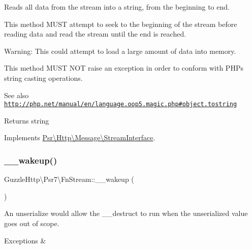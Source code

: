 Reads all data from the stream into a string, from the beginning to end.

This method M\+U\+ST attempt to seek to the beginning of the stream before reading data and read the stream until the end is reached.

Warning\+: This could attempt to load a large amount of data into memory.

This method M\+U\+ST N\+OT raise an exception in order to conform with P\+HP\textquotesingle{}s string casting operations.

\begin{DoxySeeAlso}{See also}
\href{http://php.net/manual/en/language.oop5.magic.php#object.tostring}{\tt http\+://php.\+net/manual/en/language.\+oop5.\+magic.\+php\#object.\+tostring} 
\end{DoxySeeAlso}
\begin{DoxyReturn}{Returns}
string 
\end{DoxyReturn}


Implements \hyperlink{interfacePsr_1_1Http_1_1Message_1_1StreamInterface_a72df4e8851ae1a81087f3415fd6d73cd}{Psr\textbackslash{}\+Http\textbackslash{}\+Message\textbackslash{}\+Stream\+Interface}.

\mbox{\label{classGuzzleHttp_1_1Psr7_1_1FnStream_ae684f892bfd98ed198432fe26ad43963}} 
\subsubsection{\texorpdfstring{\+\_\+\+\_\+wakeup()}{\_\_wakeup()}}
{\footnotesize\ttfamily Guzzle\+Http\textbackslash{}\+Psr7\textbackslash{}\+Fn\+Stream\+::\+\_\+\+\_\+wakeup (\begin{DoxyParamCaption}{ }\end{DoxyParamCaption})}

An unserialize would allow the \+\_\+\+\_\+destruct to run when the unserialized value goes out of scope. 
\begin{DoxyExceptions}{Exceptions}
{\em } & \\
\hline
\end{DoxyExceptions}
\mbox{\label{classGuzzleHttp_1_1Psr7_1_1FnStream_a45793fd71b5136c5dbfcac2c25950cc4}} 
